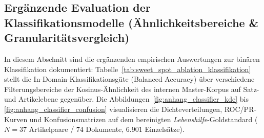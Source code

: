 \begin{table}[htbp]
\centering
\small
\caption[Monotonie-Prüfung der Regressoren über 6 CEFR-Niveaustufen auf MERLIN]{Mittelwerte der vorhergesagten Modell-Scores über sechs Niveaustufen des Gemeinsamen Europäischen Referenzrahmens für Sprachen (CEFR, $A1$ bis $C2$) im MERLIN-Korpus ($N = 1.033$ Texte) zur Überprüfung des monotonen Abfalls für BiLSTM-MixUp-Regressoren und die Wiener Sachtextformel (WSTF).}
\label{tab:anhang_merlin_monotonie}
\end{table}

\newpage
\subsection{Ergänzende Evaluation der Klassifikationsmodelle (Ähnlichkeitsbereiche \& Granularitätsvergleich)}
\label{sec:anhang_klassifikatoren}

In diesem Abschnitt sind die ergänzenden empirischen Auswertungen zur binären Klassifikation dokumentiert: Tabelle~\ref{tab:sweet_spot_ablation_klassifikation} stellt die In-Domain-Klassifikationsgüte (Balanced Accuracy) über verschiedene Filterungsbereiche der Kosinus-Ähnlichkeit des internen Master-Korpus auf Satz- und Artikelebene gegenüber. Die Abbildungen~\ref{fig:anhang_classifier_kde} bis \ref{fig:anhang_classifier_confusion} visualisieren die Dichteverteilungen, ROC/PR-Kurven und Konfusionsmatrizen auf dem bereinigten \textit{Lebenshilfe}-Goldstandard ($N = 37$ Artikelpaare / $74$ Dokumente, $6.901$ Einzelsätze).

